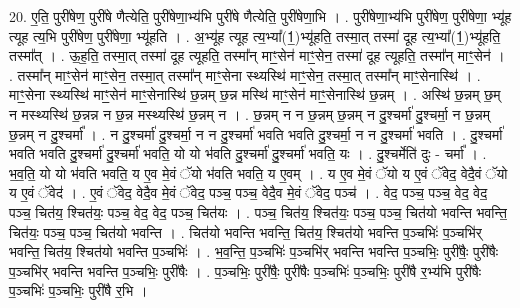 \documentclass[17pt]{extarticle}
\begin{document}
20. ए॒ति॒ पुरी॑षेण॒ पुरी॑षे णैत्येति॒ पुरी॑षेणा॒भ्य॑भि पुरी॑षे णैत्येति॒ पुरी॑षेणा॒भि । . पुरी॑षेणा॒भ्य॑भि पुरी॑षेण॒ पुरी॑षेणा॒ भ्यू॑ह त्यूह त्य॒भि पुरी॑षेण॒ पुरी॑षेणा॒ भ्यू॑हति । . अ॒भ्यू॑ह त्यूह त्य॒भ्या᳚(1॒)भ्यू॑हति॒ तस्मा॒त् तस्मा॑ दूह त्य॒भ्या᳚(1॒)भ्यू॑हति॒ तस्मा᳚त् । . ऊ॒ह॒ति॒ तस्मा॒त् तस्मा॑ दूह त्यूहति॒ तस्मा᳚न् माꣳ॒॒सेन॑ माꣳ॒॒सेन॒ तस्मा॑ दूह त्यूहति॒ तस्मा᳚न् माꣳ॒॒सेन॑ । . तस्मा᳚न् माꣳ॒॒सेन॑ माꣳ॒॒सेन॒ तस्मा॒त् तस्मा᳚न् माꣳ॒॒सेना स्थ्यस्थि॑ माꣳ॒॒सेन॒ तस्मा॒त् तस्मा᳚न् माꣳ॒॒सेनास्थि॑ । . माꣳ॒॒सेना स्थ्यस्थि॑ माꣳ॒॒सेन॑ माꣳ॒॒सेनास्थि॑ छ॒न्नम् छ॒न्न मस्थि॑ माꣳ॒॒सेन॑ माꣳ॒॒सेनास्थि॑ छ॒न्नम् । . अस्थि॑ छ॒न्नम् छ॒म् न मस्थ्यस्थि॑ छ॒न्नन्न न छ॒न्न मस्थ्यस्थि॑ छ॒न्नम् न । . छ॒न्नम् न न छ॒न्नम् छ॒न्नम् न दु॒श्चर्मा॑ दु॒श्चर्मा॒ न छ॒न्नम् छ॒न्नम् न दु॒श्चर्मा᳚ । . न दु॒श्चर्मा॑ दु॒श्चर्मा॒ न न दु॒श्चर्मा॑ भवति भवति दु॒श्चर्मा॒ न न दु॒श्चर्मा॑ भवति । . दु॒श्चर्मा॑ भवति भवति दु॒श्चर्मा॑ दु॒श्चर्मा॑ भवति॒ यो यो भ॑वति दु॒श्चर्मा॑ दु॒श्चर्मा॑ भवति॒ यः । . दु॒श्चर्मेति॑ दुः - चर्मा᳚ । . भ॒व॒ति॒ यो यो भ॑वति भवति॒ य ए॒व मे॒वं ॅयो भ॑वति भवति॒ य ए॒वम् । . य ए॒व मे॒वं ॅयो य ए॒वं ॅवेद॒ वेदै॒वं ॅयो य ए॒वं ॅवेद॑ । . ए॒वं ॅवेद॒ वेदै॒व मे॒वं ॅवेद॒ पञ्च॒ पञ्च॒ वेदै॒व मे॒वं ॅवेद॒ पञ्च॑ । . वेद॒ पञ्च॒ पञ्च॒ वेद॒ वेद॒ पञ्च॒ चित॑य॒ श्चित॑यः॒ पञ्च॒ वेद॒ वेद॒ पञ्च॒ चित॑यः । . पञ्च॒ चित॑य॒ श्चित॑यः॒ पञ्च॒ पञ्च॒ चित॑यो भवन्ति भवन्ति॒ चित॑यः॒ पञ्च॒ पञ्च॒ चित॑यो भवन्ति । . चित॑यो भवन्ति भवन्ति॒ चित॑य॒ श्चित॑यो भवन्ति प॒ञ्चभिः॑ प॒ञ्चभि॑र् भवन्ति॒ चित॑य॒ श्चित॑यो भवन्ति प॒ञ्चभिः॑ । . भ॒व॒न्ति॒ प॒ञ्चभिः॑ प॒ञ्चभि॑र् भवन्ति भवन्ति प॒ञ्चभिः॒ पुरी॑षैः॒ पुरी॑षैः प॒ञ्चभि॑र् भवन्ति भवन्ति प॒ञ्चभिः॒ पुरी॑षैः । . प॒ञ्चभिः॒ पुरी॑षैः॒ पुरी॑षैः प॒ञ्चभिः॑ प॒ञ्चभिः॒ पुरी॑षै र॒भ्य॑भि पुरी॑षैः प॒ञ्चभिः॑ प॒ञ्चभिः॒ पुरी॑षै र॒भि । \newline
\end{document}
